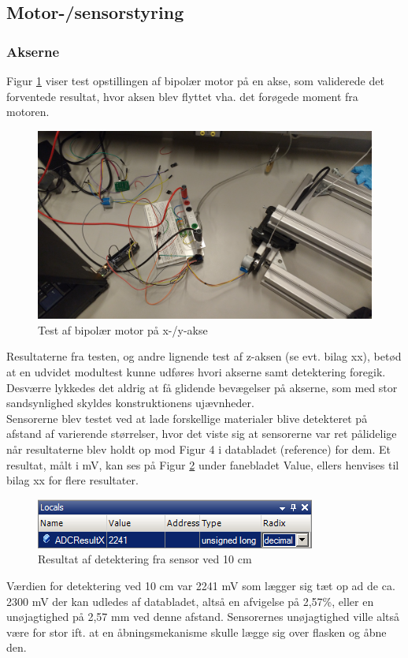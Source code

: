 \subsection{Motor-/sensorstyring}
\subsubsection{Akserne}
Figur \ref{Bipolar} viser test opstillingen af bipolær motor på en akse, som validerede det forventede resultat, hvor aksen blev flyttet vha. det forøgede moment fra motoren. \\

\begin{figure}[H]
	\includegraphics[scale=0.09]{tex/Test/Motor-sensor/Bipolar_test_opstilling.jpg}
	\caption{Test af bipolær motor på x-/y-akse}
	\label{Bipolar}
\end{figure}

\noindent
Resultaterne fra testen, og andre lignende test af z-aksen (se evt. bilag xx), betød at en udvidet modultest kunne udføres hvori akserne samt detektering foregik. Desværre lykkedes det aldrig at få glidende bevægelser på akserne, som med stor sandsynlighed skyldes konstruktionens ujævnheder. \\

Sensorerne blev testet ved at lade forskellige materialer blive detekteret på afstand af varierende størrelser, hvor det viste sig at sensorerne var ret pålidelige når resultaterne blev holdt op mod Figur 4 i databladet (reference) for dem. Et resultat, målt i mV, kan ses på Figur \ref{Sensor_10cm} under fanebladet Value, ellers henvises til bilag xx for flere resultater. \\

\begin{figure}[H]
	\includegraphics[scale=1]{tex/Test/Motor-sensor/Sensor_10cm.png}
	\caption{Resultat af detektering fra sensor ved 10 cm}
	\label{Sensor_10cm}
\end{figure}

Værdien for detektering ved 10 cm var 2241 mV som lægger sig tæt op ad de ca. 2300 mV der kan udledes af databladet, altså en afvigelse på 2,57\%, eller en unøjagtighed på 2,57 mm ved denne afstand. Sensorernes unøjagtighed ville altså være for stor ift. at en åbningsmekanisme skulle lægge sig over flasken og åbne den.